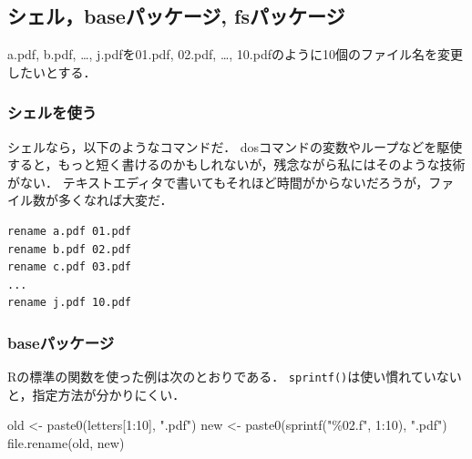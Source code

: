 \documentclass[
]{article}
\newenvironment{Shaded}{\begin{snugshade}}{\end{snugshade}}
\newcommand{\DecValTok}[1]{\textcolor[rgb]{0.00,0.00,0.81}{#1}}
\newcommand{\FunctionTok}[1]{\textcolor[rgb]{0.00,0.00,0.00}{#1}}
\newcommand{\NormalTok}[1]{#1}
\newcommand{\OtherTok}[1]{\textcolor[rgb]{0.56,0.35,0.01}{#1}}
\newcommand{\SpecialCharTok}[1]{\textcolor[rgb]{0.00,0.00,0.00}{#1}}
\newcommand{\StringTok}[1]{\textcolor[rgb]{0.31,0.60,0.02}{#1}}
\begin{document}
\hypertarget{ux30b7ux30a7ux30ebbaseux30d1ux30c3ux30b1ux30fcux30b8-fsux30d1ux30c3ux30b1ux30fcux30b8}{%
\subsection{シェル，baseパッケージ, fsパッケージ}\label{ux30b7ux30a7ux30ebbaseux30d1ux30c3ux30b1ux30fcux30b8-fsux30d1ux30c3ux30b1ux30fcux30b8}}

a.pdf, b.pdf, \ldots, j.pdfを01.pdf, 02.pdf, \ldots, 10.pdfのように10個のファイル名を変更したいとする．

\hypertarget{ux30b7ux30a7ux30ebux3092ux4f7fux3046}{%
\subsubsection{シェルを使う}\label{ux30b7ux30a7ux30ebux3092ux4f7fux3046}}

シェルなら，以下のようなコマンドだ．
dosコマンドの変数やループなどを駆使すると，もっと短く書けるのかもしれないが，残念ながら私にはそのような技術がない．
テキストエディタで書いてもそれほど時間がからないだろうが，ファイル数が多くなれば大変だ．

\begin{verbatim}
rename a.pdf 01.pdf
rename b.pdf 02.pdf
rename c.pdf 03.pdf
...
rename j.pdf 10.pdf
\end{verbatim}

\hypertarget{baseux30d1ux30c3ux30b1ux30fcux30b8}{%
\subsubsection{baseパッケージ}\label{baseux30d1ux30c3ux30b1ux30fcux30b8}}

Rの標準の関数を使った例は次のとおりである．
\texttt{sprintf()}は使い慣れていないと，指定方法が分かりにくい．

\begin{Shaded}
\begin{Highlighting}[]
\NormalTok{old }\OtherTok{\textless{}{-}} \FunctionTok{paste0}\NormalTok{(letters[}\DecValTok{1}\SpecialCharTok{:}\DecValTok{10}\NormalTok{], }\StringTok{".pdf"}\NormalTok{)}
\NormalTok{new }\OtherTok{\textless{}{-}} \FunctionTok{paste0}\NormalTok{(}\FunctionTok{sprintf}\NormalTok{(}\StringTok{"\%02.f"}\NormalTok{, }\DecValTok{1}\SpecialCharTok{:}\DecValTok{10}\NormalTok{), }\StringTok{".pdf"}\NormalTok{)}
\FunctionTok{file.rename}\NormalTok{(old, new)}
\end{Highlighting}
\end{Shaded}
\end{document}

